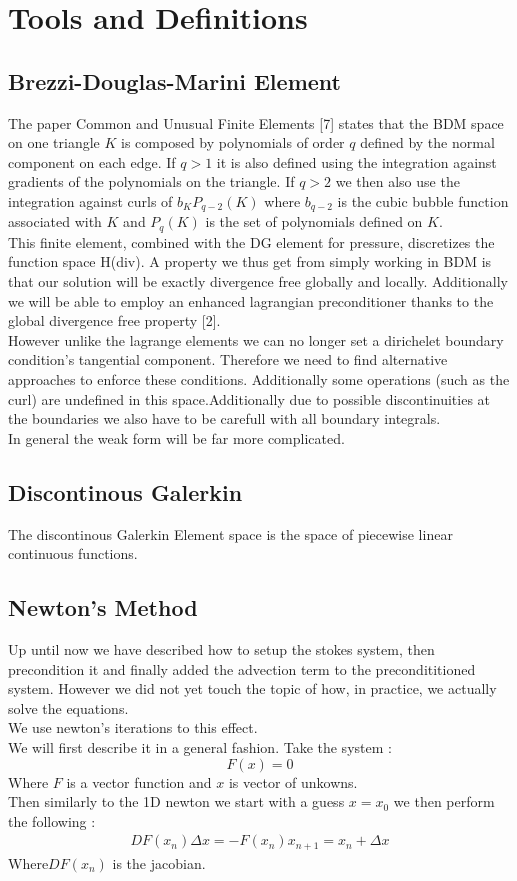 \documentclass[11pt,twoside,a4paper]{article}
\begin{document}
\section{Tools and Definitions}
\subsection{Brezzi-Douglas-Marini Element}
The paper Common and Unusual Finite Elements [7] states that the BDM space on one triangle $K$ is composed by polynomials of order $q$ defined by the normal component on each edge. If $q > 1$ it is also defined using the integration against gradients of the polynomials on the triangle. If $q > 2$ we then also use the integration  against curls of $b_K P_{q-2}(K)$ where $b_{q-2}$ is the  cubic bubble function associated with $K$ and $P_{q}(K)$ is the set of polynomials defined on $K$.\\
This finite element, combined with the DG element for pressure, discretizes the function space H(div). A property we thus get from simply working in BDM is that our solution will be exactly divergence free globally and locally.
Additionally we will be able to employ an enhanced lagrangian preconditioner thanks to the global divergence free property [2].\\

However unlike the lagrange elements we can no longer set a dirichelet boundary condition's tangential component. Therefore we need to find alternative approaches to enforce these conditions.
Additionally some operations (such as the curl) are undefined in this space.Additionally due to possible discontinuities at the boundaries we also have to be carefull with all boundary integrals.\\

In general the weak form will be far more complicated.


\subsection{Discontinous Galerkin}
The discontinous Galerkin Element space is the space of piecewise linear continuous functions.

\subsection{Newton's Method}
Up until now we have described how to setup the stokes system, then precondition it and finally added the advection term to the precondititioned system. However we did not yet touch the topic of how, in practice, we actually solve the equations.\\
We use newton's iterations to this effect.\\
We will first describe it in a general fashion. Take the system :
$$
F(x) = 0
$$
Where $F$ is a vector function and $x$ is vector of unkowns.\\
Then similarly to the 1D newton we start with a guess $x = x_0$ we then perform the following :
\begin{align}
DF(x_n) \Delta x = - F(x_n)
x_{n+1} = x_n + \Delta x 
\end{align}
Where$DF(x_n)$ is the jacobian.
\end{document}
